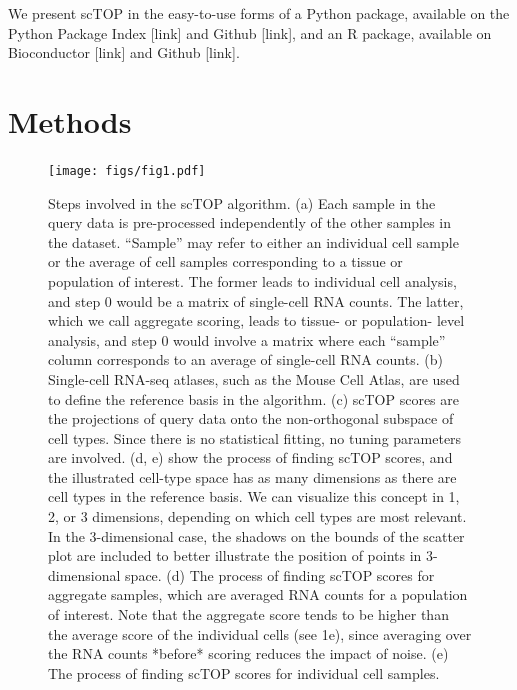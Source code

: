 \documentclass[aps,superscriptaddress, notitlepage,longbibliography]{revtex4-1}
\begin{document}
We present scTOP in the easy-to-use forms of a Python package, available on the Python Package Index [link] and Github [link], and an R package, available on Bioconductor [link] and Github [link].

\section{Methods}
\begin{figure}
	\centering
		\texttt{[image: figs/fig1.pdf]}
	\caption{Steps involved in the scTOP algorithm. (a) Each sample in the query data is pre-processed independently of the other samples in the dataset. “Sample” may refer to either an individual cell sample or the average of cell samples corresponding to a tissue or population of interest. The former leads to individual cell analysis, and step 0 would be a matrix of single-cell RNA counts. The latter, which we call aggregate scoring, leads to tissue- or population- level analysis, and step 0 would involve a matrix where each “sample” column corresponds to an average of single-cell RNA counts. (b) Single-cell RNA-seq atlases, such as the Mouse Cell Atlas, are used to define the reference basis in the algorithm. (c) scTOP scores are the projections of query data onto the non-orthogonal subspace of cell types. Since there is no statistical fitting, no tuning parameters are involved. (d, e) show the process of finding scTOP scores, and the illustrated cell-type space has as many dimensions as there are cell types in the reference basis. We can visualize this concept in 1, 2, or 3 dimensions, depending on which cell types are most relevant. In the 3-dimensional case, the shadows on the bounds of the scatter plot are included to better illustrate the position of points in 3-dimensional space. (d) The process of finding scTOP scores for aggregate samples, which are averaged RNA counts for a population of interest. Note that the aggregate score tends to be higher than the average score of the individual cells (see 1e), since averaging over the RNA counts *before* scoring reduces the impact of noise. (e) The process of finding scTOP scores for individual cell samples.}
	\label{FIG:1}
\end{figure}
\end{document}

